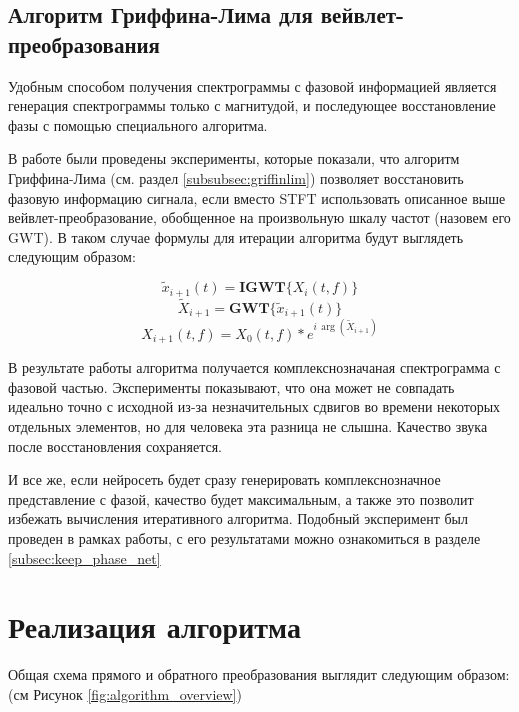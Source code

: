 \subsection{Алгоритм Гриффина-Лима для вейвлет-преобразования}

Удобным способом получения спектрограммы с фазовой информацией является генерация спектрограммы только с магнитудой, 
и последующее восстановление фазы с помощью специального алгоритма.

В работе были проведены эксперименты, которые показали, что алгоритм Гриффина-Лима (см. раздел \ref{subsubsec:griffinlim})
позволяет восстановить фазовую информацию сигнала, если вместо STFT использовать описанное выше 
вейвлет-преобразование, обобщенное на произвольную шкалу частот (назовем его GWT). В таком случае формулы для итерации алгоритма
будут выглядеть следующим образом:

\begin{equation}
  \tilde{x}_{i+1}(t) = \textbf{IGWT}\{X_i(t, f)\}
  \label{eq:griffin_lim_1}
\end{equation}
\begin{equation}
  \tilde{X}_{i+1} = \textbf{GWT}\{\tilde{x}_{i+1}(t)\}
  \label{eq:griffin_lim_2}
\end{equation}
\begin{equation}
  X_{i+1}(t, f) = X_0(t, f) * e^{i\,\arg(\tilde{X}_{i+1})}
  \label{eq:griffin_lim_3}
\end{equation}

В результате работы алгоритма получается комплекснозначаная спектрограмма с фазовой частью. 
Эксперименты показывают, что она может не совпадать идеально точно с исходной 
из-за незначительных сдвигов во времени некоторых отдельных элементов, но для человека эта разница не слышна.
Качество звука после восстановления сохраняется.

И все же, если нейросеть будет сразу генерировать комплекснозначное представление с фазой, 
качество будет максимальным, а также это позволит избежать вычисления итеративного алгоритма.
Подобный эксперимент был проведен в рамках работы, с его результатами можно ознакомиться в разделе \ref{subsec:keep_phase_net}


\section{Реализация алгоритма}

Общая схема прямого и обратного преобразования выглядит следующим образом: (см Рисунок \ref{fig:algorithm_overview})

